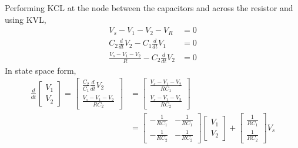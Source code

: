 \documentclass[]{article}
\newcommand{\diff}[1]{\frac{d}{d #1}}
\begin{document}
Performing KCL at the node between the capacitors and across the resistor and using KVL,
\begin{align}
	V_s - V_1 - V_2 - V_R &= 0 \\
	C_2\diff{t} V_2 - C_1\diff{t} V_1 &= 0 \\
	\frac{V_s - V_1 - V_2}{R} - C_2\diff{t} V_2 &= 0
\end{align}
In state space form,
\begin{align}
	\diff{t} \begin{bmatrix}
	V_1 \\
	V_2
	\end{bmatrix} = \begin{bmatrix}
	\frac{C_2}{C_1} \diff{t} V_2 \\
	\frac{V_s - V_1 - V_2}{RC_2}
	\end{bmatrix} &= \begin{bmatrix}
	\frac{V_s - V_1 - V_2}{RC_1} \\
	\frac{V_s - V_1 - V_2}{RC_2}
	\end{bmatrix} \\
	&= \begin{bmatrix}
	-\frac{1}{RC_1} & -\frac{1}{RC_1} \\
	-\frac{1}{RC_2} & -\frac{1}{RC_2}
	\end{bmatrix} \begin{bmatrix}
	V_1 \\
	V_2
	\end{bmatrix} + \begin{bmatrix}
	\frac{1}{RC_1} \\
	\frac{1}{RC_2}
	\end{bmatrix} V_s
\end{align}

\subsection{}
\end{document}
